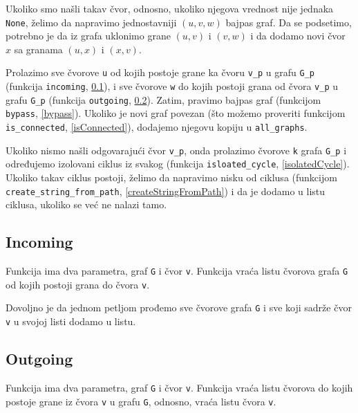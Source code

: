 Ukoliko smo našli takav čvor, odnosno, ukoliko njegova vrednost nije jednaka \texttt{None}, želimo da napravimo jednostavniji $(u, v, w)$ bajpas graf. Da se podsetimo, potrebno je da iz grafa uklonimo grane $(u, v)$ i $(v, w)$ i da dodamo novi čvor $x$ sa granama $(u, x)$ i $(x, v)$.

Prolazimo sve čvorove \texttt{u} od kojih postoje grane ka čvoru \texttt{v\_p} u grafu \texttt{G\_p} (funkcija \texttt{incoming}, \ref{incoming}), i sve čvorove \texttt{w} do kojih postoji grana od čvora \texttt{v\_p} u grafu \texttt{G\_p} (funkcija \texttt{outgoing}, \ref{outgoing}). Zatim, pravimo bajpas graf (funkcijom \texttt{bypass}, \ref{bypass}). Ukoliko je novi graf povezan (što možemo proveriti funkcijom \texttt{is\_connected}, \ref{isConnected}), dodajemo njegovu kopiju u \texttt{all\_graphs}.

Ukoliko nismo našli odgovarajući čvor \texttt{v\_p}, onda prolazimo čvorove \texttt{k} grafa \texttt{G\_p} i određujemo izolovani ciklus iz svakog (funkcija \texttt{isloated\_cycle}, \ref{isolatedCycle}). Ukoliko takav ciklus postoji, želimo da napravimo nisku od ciklusa (funkcijom \texttt{create\_string\_from\_path}, \ref{createStringFromPath}) i da je dodamo u listu ciklusa, ukoliko se već ne nalazi tamo.




\subsection{Incoming}
\label{incoming}

Funkcija ima dva parametra, graf \texttt{G} i čvor \texttt{v}. Funkcija vraća listu čvorova grafa \texttt{G} od kojih postoji grana do čvora \texttt{v}.

Dovoljno je da jednom petljom prođemo sve čvorove grafa \texttt{G} i sve koji sadrže čvor \texttt{v} u svojoj listi dodamo u listu.



\subsection{Outgoing}
\label{outgoing}

Funkcija ima dva parametra, graf \texttt{G} i čvor \texttt{v}. Funkcija vraća listu čvorova do kojih postoje grane iz čvora \texttt{v} u grafu \texttt{G}, odnosno, vraća listu čvora \texttt{v}.

